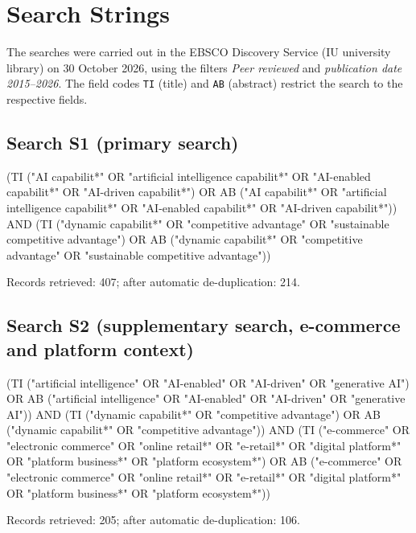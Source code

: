 
\chapter{Search Strings}
\label{AppendixA}

The searches were carried out in the EBSCO Discovery Service (IU university library) on 30 October 2026, using the filters \emph{Peer reviewed} and \emph{publication date 2015--2026}. The field codes \texttt{TI} (title) and \texttt{AB} (abstract) restrict the search to the respective fields.

\section*{Search S1 (primary search)}

{\small{}\raggedright\ttfamily
(TI ("AI capabilit*" OR "artificial intelligence capabilit*" OR "AI-enabled capabilit*" OR "AI-driven capabilit*") OR AB ("AI capabilit*" OR "artificial intelligence capabilit*" OR "AI-enabled capabilit*" OR "AI-driven capabilit*")) AND (TI ("dynamic capabilit*" OR "competitive advantage" OR "sustainable competitive advantage") OR AB ("dynamic capabilit*" OR "competitive advantage" OR "sustainable competitive advantage"))\par}

Records retrieved: 407; after automatic de-duplication: 214.

\section*{Search S2 (supplementary search, e-commerce and platform context)}

{\small{}\raggedright\ttfamily
(TI ("artificial intelligence" OR "AI-enabled" OR "AI-driven" OR "generative AI") OR AB ("artificial intelligence" OR "AI-enabled" OR "AI-driven" OR "generative AI")) AND (TI ("dynamic capabilit*" OR "competitive advantage") OR AB ("dynamic capabilit*" OR "competitive advantage")) AND (TI ("e-commerce" OR "electronic commerce" OR "online retail*" OR "e-retail*" OR "digital platform*" OR "platform business*" OR "platform ecosystem*") OR AB ("e-commerce" OR "electronic commerce" OR "online retail*" OR "e-retail*" OR "digital platform*" OR "platform business*" OR "platform ecosystem*"))\par}

Records retrieved: 205; after automatic de-duplication: 106.
